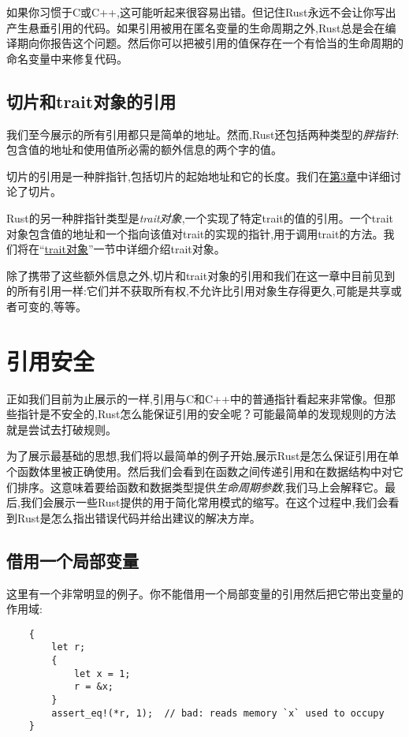 如果你习惯于C或C++,这可能听起来很容易出错。但记住Rust永远不会让你写出产生悬垂引用的代码。如果引用被用在匿名变量的生命周期之外,Rust总是会在编译期向你报告这个问题。然后你可以把被引用的值保存在一个有恰当的生命周期的命名变量中来修复代码。

\subsection{切片和trait对象的引用}
我们至今展示的所有引用都只是简单的地址。然而,Rust还包括两种类型的\emph{胖指针}:包含值的地址和使用值所必需的额外信息的两个字的值。

切片的引用是一种胖指针,包括切片的起始地址和它的长度。我们在\hyperref[ch03]{第3章}中详细讨论了切片。

Rust的另一种胖指针类型是\emph{trait对象},一个实现了特定trait的值的引用。一个trait对象包含值的地址和一个指向该值对trait的实现的指针,用于调用trait的方法。我们将在“\hyperref[traitobject]{trait对象}”一节中详细介绍trait对象。

除了携带了这些额外信息之外,切片和trait对象的引用和我们在这一章中目前见到的所有引用一样:它们并不获取所有权,不允许比引用对象生存得更久,可能是共享或者可变的,等等。

\section{引用安全}

正如我们目前为止展示的一样,引用与C和C++中的普通指针看起来非常像。但那些指针是不安全的,Rust怎么能保证引用的安全呢？可能最简单的发现规则的方法就是尝试去打破规则。

为了展示最基础的思想,我们将以最简单的例子开始,展示Rust是怎么保证引用在单个函数体里被正确使用。然后我们会看到在函数之间传递引用和在数据结构中对它们排序。这意味着要给函数和数据类型提供\emph{生命周期参数},我们马上会解释它。最后,我们会展示一些Rust提供的用于简化常用模式的缩写。在这个过程中,我们会看到Rust是怎么指出错误代码并给出建议的解决方岸。

\subsection{借用一个局部变量}

这里有一个非常明显的例子。你不能借用一个局部变量的引用然后把它带出变量的作用域:
\begin{verbatim}
    {
        let r;
        {
            let x = 1;
            r = &x;
        }
        assert_eq!(*r, 1);  // bad: reads memory `x` used to occupy
    }
\end{verbatim}

